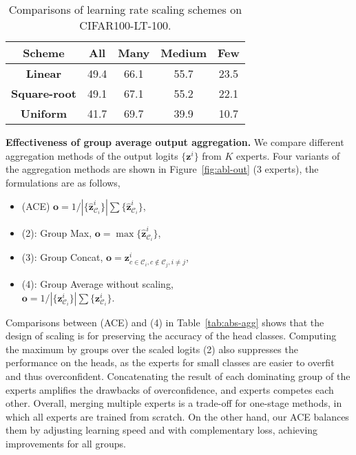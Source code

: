 \begin{table}[h]
\begin{center}
\small
\begin{tabular}{c|c|c c c}
\toprule[1.5pt]
\textbf{Scheme} &  \textbf{All} & \textbf{Many} & \textbf{Medium} & \textbf{Few}\\\hline\hline
 \textbf{Linear} &  49.4 & 66.1 & 55.7 & 23.5\\
\textbf{Square-root} &  49.1 & 67.1 & 55.2 & 22.1 \\
\textbf{Uniform}   & 41.7 &  69.7 & 39.9 & 10.7\\
\bottomrule[1.5pt]
\end{tabular}
\end{center}
\caption{Comparisons of learning rate scaling schemes on CIFAR100-LT-100.}
\label{tab:abs-lr}
\end{table}

\textbf{Effectiveness of group average output aggregation.} We compare different aggregation methods of the output logits $\{\textbf{z}^{i}\}$ from $K$ experts. Four variants of the aggregation methods are shown in Figure~\ref{fig:abl-out} (3 experts), the formulations are as follows,
\begin{itemize}
    \item (ACE) $\textbf{o} = 1 / |\{ \hat{\textbf{z}}^{i}_{\mathcal{C}_i}\}| \sum \{ \hat{\textbf{z}}^{i}_{\mathcal{C}_i}\}$,
    \item (2): Group Max, $\textbf{o}=\max \{ \hat{\textbf{z}}^{i}_{\mathcal{C}_i}\}$,
    \item (3): Group Concat, $\textbf{o}=\textbf{z}^{i}_{c \in \mathcal{C}_i,c \not \in \mathcal{C}_j, i\neq j}$,
    \item (4): Group Average without scaling,\\ $\textbf{o}=1 / |\{ \textbf{z}^{i}_{\mathcal{C}_i}\}| \sum \{ \textbf{z}^{i}_{\mathcal{C}_i}\}$.
\end{itemize}

Comparisons between (ACE) and (4) in Table~\ref{tab:abs-agg} shows that the design of scaling is for preserving the accuracy of the head classes. Computing the maximum by groups over the scaled logits (2) also suppresses the performance on the heads, as the experts for small classes are easier to overfit and thus overconfident. Concatenating the result of each dominating group of the experts amplifies the drawbacks of overconfidence, and experts competes each other. Overall, merging multiple experts is a trade-off for one-stage methods, in which all experts are trained from scratch. On the other hand, our ACE balances them by adjusting learning speed and with complementary loss, achieving improvements for all groups. 

